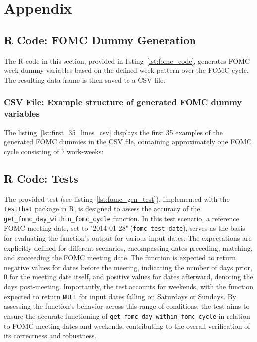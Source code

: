 \chapter{Appendix}

\section{R Code: FOMC Dummy Generation}
\label{app:fomc_code}

The R code in this section, provided in listing~\ref{lst:fomc_code}, generates FOMC week dummy variables based on the defined week pattern over the FOMC cycle. The resulting data frame is then saved to a CSV file.



\subsection{CSV File: Example structure of generated FOMC dummy variables}
\label{app:first_35_lines_csv}

The listing~\ref{lst:first_35_lines_csv} displays the first 35 examples of the generated FOMC dummies in the CSV file,  containing approximately one FOMC cycle consisting of 7 work-weeks:



\section{R Code: Tests}
\label{app:fomc_code}

The provided test (see listing~\ref{lst:fomc_gen_test}), implemented with the \texttt{testthat} package in R, is designed to assess the accuracy of the \texttt{get\_fomc\_day\_within\_fomc\_cycle} function. In this test scenario, a reference FOMC meeting date, set to "2014-01-28" (\texttt{fomc\_test\_date}), serves as the basis for evaluating the function's output for various input dates. The expectations are explicitly defined for different scenarios, encompassing dates preceding, matching, and succeeding the FOMC meeting date. The function is expected to return negative values for dates before the meeting, indicating the number of days prior, 0 for the meeting date itself, and positive values for dates afterward, denoting the days post-meeting. Importantly, the test accounts for weekends, with the function expected to return \texttt{NULL} for input dates falling on Saturdays or Sundays. By assessing the function's behavior across this range of conditions, the test aims to ensure the accurate functioning of \texttt{get\_fomc\_day\_within\_fomc\_cycle} in relation to FOMC meeting dates and weekends, contributing to the overall verification of its correctness and robustness.



